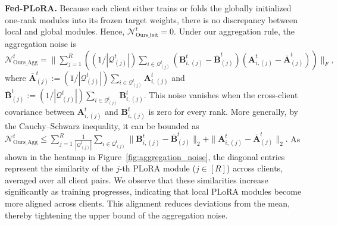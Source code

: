 \documentclass{article} %
\newcommand{\Init}{\mathsf{Init}}
\newcommand{\supplement}[1]{\textit{#1}}
\newcounter{todo} %
\newcommand{\hu}[1]{\stepcounter{todo}
  {\color{blue!90} #1}}
\begin{document}
\textbf{Fed-PLoRA.} Because each client either trains or folds the globally initialized one-rank modules into its frozen target weights, there is no discrepancy between local and global modules. Hence, $\mathcal{N}_{\text{Ours\_}\Init}^{t} = 0$. 
% 
Under our aggregation rule, the aggregation noise is 
$
   \mathcal{N}_{\text{Ours\_Agg}}^{t}   =  \| \sum_{j=1}^{R}(({1}/{|\mathcal{Q}_{(j)}^t|}) \sum_{i \in \mathcal{Q}_{(j)}^t} (\mathbf{B}_{i,(j)}^{t} - \overline{\mathbf{B}}_{(j)}^t)(\mathbf{A}_{i,(j)}^{t} - \overline{\mathbf{A}}_{(j)}^t) )\|_F,
   \label{eq:agg_noise_plora}
$
where $\overline{\mathbf{A}}_{(j)}^t := ({1}/{|\mathcal{Q}_{(j)}^t|})\sum_{i \in \mathcal{Q}_{(j)}^t} \mathbf{A}_{i,(j)}^t$ 
and $\overline{\mathbf{B}}_{(j)}^t := ({1}/{|\mathcal{Q}_{(j)}^t|}) \sum_{i \in \mathcal{Q}_{(j)}^t} \mathbf{B}_{i,(j)}^t$. This noise vanishes when the cross-client covariance between $\mathbf{A}_{i,(j)}^t$ and $\mathbf{B}_{i,(j)}^t$ is zero for every rank. More generally, by the Cauchy–Schwarz inequality, it can be bounded as 
$
\mathcal{N}_{\text{Ours\_Agg}}^{t}  \leq \sum_{j=1}^{R}\frac{1}{|\mathcal{Q}_{(j)}^t|} \sum_{i \in \mathcal{Q}_{(j)}^t} \|  \mathbf{B}_{i,(j)}^{t} - \overline{\mathbf{B}}_{(j)}^t \|_2 + \| \mathbf{A}_{i,(j)}^{t} - \overline{\mathbf{A}}_{(j)}^t\|_2.
$
As shown in the heatmap in Figure~\ref{fig:aggregation_noise}, the diagonal entries represent the similarity of the $j$-th PLoRA module ($j \in [R]$) across clients, averaged over all client pairs. 
We observe that these similarities increase significantly as training progresses, indicating that local PLoRA modules become more aligned across clients. This alignment reduces deviations from the mean, thereby tightening the upper bound of the aggregation noise. 
\end{document}
